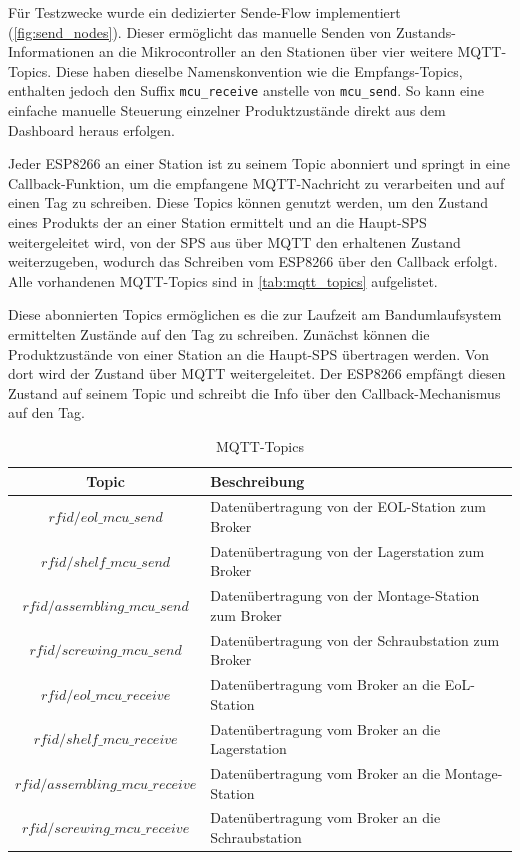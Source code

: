 Für Testzwecke wurde ein dedizierter Sende-Flow implementiert (\autoref{fig:send_nodes}). Dieser ermöglicht das manuelle Senden von Zustands-Informationen an die Mikrocontroller an den Stationen über vier weitere MQTT-Topics. Diese haben dieselbe Namenskonvention wie die Empfangs-Topics, enthalten jedoch den Suffix \texttt{mcu\_receive} anstelle von \texttt{mcu\_send}. So kann eine einfache manuelle Steuerung einzelner Produktzustände direkt aus dem Dashboard heraus erfolgen. 

Jeder ESP8266 an einer Station ist zu seinem Topic abonniert und springt in eine Callback-Funktion, um die empfangene MQTT-Nachricht zu verarbeiten und auf einen Tag zu schreiben. Diese Topics können genutzt werden, um den Zustand eines Produkts der an einer Station ermittelt und an die Haupt-SPS weitergeleitet wird, von der SPS aus über MQTT den erhaltenen Zustand weiterzugeben, wodurch das Schreiben vom ESP8266 über den Callback erfolgt. Alle vorhandenen MQTT-Topics sind in \autoref{tab:mqtt_topics} aufgelistet.

Diese abonnierten Topics ermöglichen es die zur Laufzeit am Bandumlaufsystem ermittelten Zustände auf den Tag zu schreiben. Zunächst können die Produktzustände von einer Station an die Haupt-SPS übertragen werden. Von dort wird der Zustand über MQTT weitergeleitet. Der ESP8266 empfängt diesen Zustand auf seinem Topic und schreibt die Info über den Callback-Mechanismus auf den Tag.

\begin{table}[H]
	\centering
	\caption{MQTT-Topics}
	\label{tab:mqtt_topics}
	\begin{tabular}{|c|l|}
		\hline
		\textbf{Topic} & \textbf{Beschreibung} \\ \hline
		$rfid/eol\_mcu\_send$ & Datenübertragung von der EOL-Station zum Broker \\ 
		$rfid/shelf\_mcu\_send$ & Datenübertragung von der Lagerstation zum Broker \\ 
		$rfid/assembling\_mcu\_send$ & Datenübertragung von der Montage-Station zum Broker \\ 
		$rfid/screwing\_mcu\_send$ & Datenübertragung von der Schraubstation zum Broker \\ \hline
		$rfid/eol\_mcu\_receive$ & Datenübertragung vom Broker an die EoL-Station \\ 
		$rfid/shelf\_mcu\_receive$ & Datenübertragung vom Broker an die Lagerstation\\ 
		$rfid/assembling\_mcu\_receive$ & Datenübertragung vom Broker an die Montage-Station\\ 
		$rfid/screwing\_mcu\_receive$ & Datenübertragung vom Broker an die Schraubstation \\ \hline
	\end{tabular}
\end{table}


